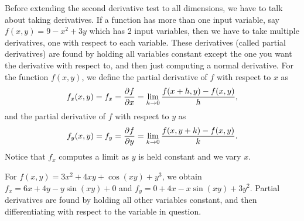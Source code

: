 Before extending the second derivative test to all dimensions, we have to talk about taking derivatives.
If a function has more than one input variable, say $f(x,y)=9-x^2+3y$ which has 2 input variables, then we have to take multiple derivatives, one with respect to each variable.  
These derivatives (called partial derivatives) are found by holding all variables constant except the one you want the derivative with respect to, and then just computing a normal derivative.
For the function $f(x,y)$, we define the partial derivative of $f$ with respect to $x$ as 
$$\displaystyle f_x(x,y)=f_x = \frac{\partial f}{\partial x}= \lim_{h\to 0}\frac{f(x+h,y)-f(x,y)}{h},$$
and the partial derivative of $f$ with respect to $y$ as 
$$\displaystyle f_y(x,y)=f_y =\frac{\partial f}{\partial y}= \lim_{k\to 0}\frac{f(x,y+k)-f(x,y)}{k}.$$
Notice that $f_x$ computes a limit as $y$ is held constant and we vary $x$. 

\begin{example}
For $f(x,y)=3x^2+4xy+\cos(xy)+y^3$, we obtain $f_x=6x+4y-y\sin(xy)+0$ and $f_y=0+4x-x\sin(xy)+3y^2$. 
Partial derivatives are found by holding all other variables constant, and then differentiating with respect to the variable in question.
\end{example}

